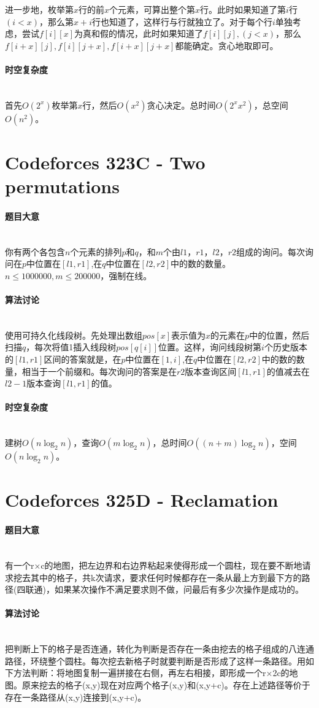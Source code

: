 \documentclass[UTF8]{ctexart}
\newcommand{\myparagraph}[1]{\paragraph{#1}\mbox{}\\}
\theoremstyle{nonumberplain}
\begin{document}
			进一步地，枚举第$x$行的前$x$个元素，可算出整个第$x$行。此时如果知道了第$i$行$(i<x)$，那么第$x+i$行也知道了，这样行与行就独立了。对于每个行$i$单独考虑，尝试$f[i][x]$为真和假的情况，此时如果知道了$f[i][j],(j<x)$，那么$f[i+x][j],f[i][j+x],f[i+x][j+x]$都能确定。贪心地取即可。
	
		\myparagraph{时空复杂度}
		
			首先$O(2^x)$枚举第$x$行，然后$O(x^2)$贪心决定。总时间$O(2^xx^2)$，总空间$O(n^2)$。
		
	\section{Codeforces 323C - Two permutations}
	
		\myparagraph{题目大意}
		
			你有两个各包含$n$个元素的排列$p$和$q$，和$m$个由$l1$，$r1$，$l2$，$r2$组成的询问。每次询问在$p$中位置在$[l1,r1]$,在$q$中位置在$[l2,r2]$中的数的数量。$n \leq 1000000, m \leq 200000$，强制在线。
			
		\myparagraph{算法讨论}
		
			使用可持久化线段树。先处理出数组$pos[x]$表示值为$x$的元素在$p$中的位置，然后扫描$q$，每次将值1插入线段树$pos[q[i]]$位置。这样，询问线段树第$i$个历史版本的$[l1,r1]$区间的答案就是，在$p$中位置在$[1,i]$,在$q$中位置在$[l2,r2]$中的数的数量，相当于一个前缀和。每次询问的答案是在$r2$版本查询区间$[l1,r1]$的值减去在$l2-1$版本查询$[l1,r1]$的值。
	
		\myparagraph{时空复杂度}
		
			建树$O(n\log_2n)$，查询$O(m\log_2n)$，总时间$O((n+m)\log_2n)$，空间$O(n\log_2n)$。
	
	\section{Codeforces 325D - Reclamation}
		
		\myparagraph{题目大意}
		
			有一个r×c的地图，把左边界和右边界粘起来使得形成一个圆柱，现在要不断地请求挖去其中的格子，共k次请求，要求任何时候都存在一条从最上方到最下方的路径(四联通)，如果某次操作不满足要求则不做，问最后有多少次操作是成功的。
		
		\myparagraph{算法讨论}
		
			把判断上下的格子是否连通，转化为判断是否存在一条由挖去的格子组成的八连通路径，环绕整个圆柱。每次挖去新格子时就要判断是否形成了这样一条路径。用如下方法判断：将地图复制一遍拼接在右侧，再左右相接，即形成一个r×2c的地图。原来挖去的格子(x,y)现在对应两个格子(x,y)和(x,y+c)。存在上述路径等价于存在一条路径从(x,y)连接到(x,y+c)。
			
\end{document}
